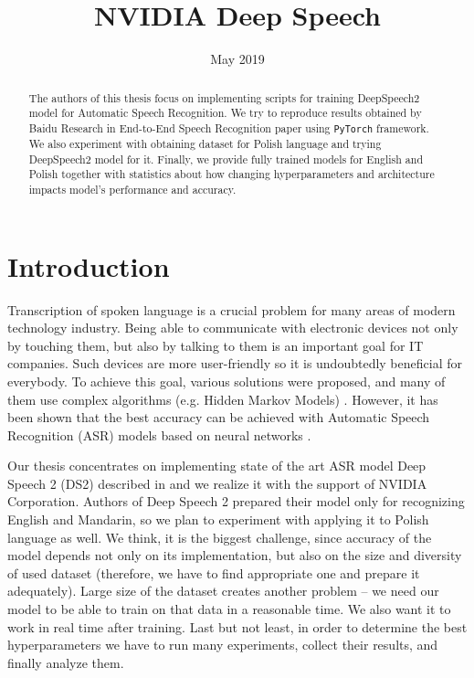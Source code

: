 \documentclass[licencjacka,en]{pracamgr}
\title{NVIDIA Deep Speech}
\date{May 2019}
\begin{document}
\maketitle

\begin{abstract}
  The authors of this thesis focus on implementing scripts for training DeepSpeech2 model for Automatic Speech Recognition. We try to reproduce results obtained by Baidu Research in End-to-End Speech Recognition paper \cite{DS2} using \texttt{PyTorch} framework. We also experiment with obtaining dataset for Polish language and trying DeepSpeech2 model for it. Finally, we provide fully trained models for English and Polish together with statistics about how changing hyperparameters and architecture impacts model's performance and accuracy.
\end{abstract}

\tableofcontents

\chapter*{Introduction}
Transcription of spoken language is a crucial problem for many areas of modern technology industry. Being able to communicate with electronic devices not only by touching them, but also by talking to them is an important goal for IT companies. Such devices are more user-friendly so it is undoubtedly beneficial for everybody. To achieve this goal, various solutions were proposed, and many of them use complex algorithms (e.g. Hidden Markov Models) \cite{DS1}. However, it has been shown that the best accuracy can be achieved with Automatic Speech Recognition (ASR) models based on neural networks \cite{DS2}.

Our thesis concentrates on implementing state of the art ASR model Deep Speech 2 (DS2) described in \cite{DS2} and we realize it with the support of NVIDIA Corporation. Authors of Deep Speech 2 prepared their model only for recognizing English and Mandarin, so we plan to experiment with applying it to Polish language as well. We think, it is the biggest challenge, since accuracy of the model depends not only on its implementation, but also on the size and diversity of used dataset (therefore, we have to find appropriate one and prepare it adequately). Large size of the dataset creates another problem -- we need our model to be able to train on that data in a reasonable time. We also want it to work in real time after training. Last but not least, in order to determine the best hyperparameters we have to run many experiments, collect their results, and finally analyze them.
\end{document}
